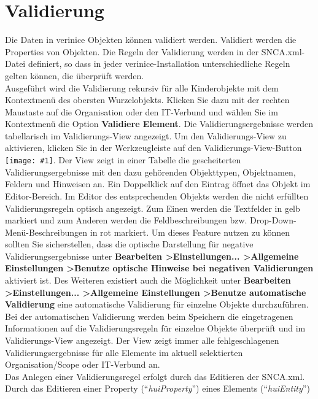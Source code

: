 \documentclass[a4paper,10pt]{book}
\newcommand{\icon}[1]{\texttt{[image: \#1]}}
\begin{document}
\section{Validierung}
Die Daten in verinice Objekten können validiert werden. Validiert werden die Properties von Objekten.
Die Regeln der Validierung werden in der SNCA.xml-Datei definiert, so dass in jeder verinice-Installation unterschiedliche Regeln gelten können, die
überprüft werden.
\\
Ausgeführt wird die Validierung rekursiv für alle Kinderobjekte mit dem Kontextmenü des obersten Wurzelobjekts. Klicken Sie dazu mit der rechten
Maustaste auf die Organisation oder den IT-Verbund und wählen Sie im Kontextmenü die Option \textbf{Validiere Element}.
Die Validierungsergebnisse werden tabellarisch im Validierungs-View angezeigt. Um den Validierungs-View zu aktivieren, klicken Sie
in der Werkzeugleiste auf den Validierungs-View-Button \icon{Icon/quickfix_warning_obj.png}. Der View zeigt in einer Tabelle
die gescheiterten Validierungsergebnisse mit den dazu gehörenden Objekttypen, Objektnamen, Feldern und Hinweisen an. Ein Doppelklick auf den Eintrag
öffnet das Objekt im Editor-Bereich. Im Editor des entsprechenden Objekts werden die nicht erfüllten Validierungsregeln optisch angezeigt.
Zum Einen werden die Textfelder in gelb markiert und zum Anderen werden die Feldbeschreibungen bzw. Drop-Down-Menü-Beschreibungen in rot markiert.
Um dieses Feature nutzen zu können sollten Sie sicherstellen, dass die optische Darstellung für negative Validierungsergebnisse
unter \textbf{Bearbeiten \textgreater Einstellungen... \textgreater Allgemeine Einstellungen \textgreater Benutze optische
Hinweise bei negativen Validierungen} aktiviert ist. Des Weiteren existiert auch die Möglichkeit unter \textbf{Bearbeiten
\textgreater Einstellungen... \textgreater Allgemeine Einstellungen \textgreater Benutze automatische Validierung} eine automatische
Validierung für einzelne Objekte durchzuführen. Bei der automatischen Validierung werden beim Speichern die eingetragenen Informationen
auf die Validierungsregeln für einzelne Objekte überprüft und im Validierungs-View angezeigt. Der View zeigt immer alle fehlgeschlagenen
Validierungsergebnisse für alle Elemente im aktuell selektierten Organisation/Scope oder IT-Verbund an.
\newline\\
Das Anlegen einer Validierungsregel erfolgt durch das Editieren der SNCA.xml. Durch das Editieren
einer Property (``\textit{huiProperty}'') eines Elements (``\textit{huiEntity}'')
\end{document}
